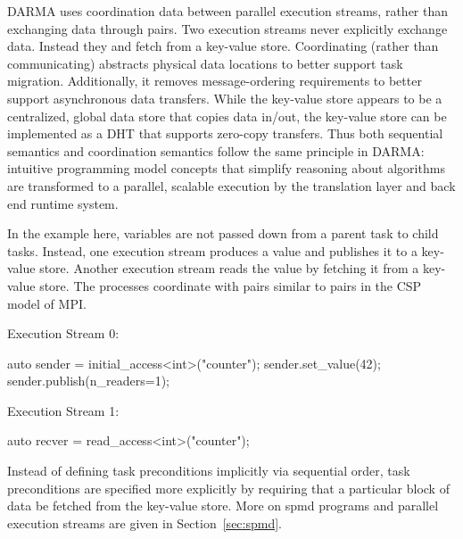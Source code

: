 \gls{DARMA} uses coordination data between parallel \glspl{execution stream},
rather than exchanging data through  pairs. 
Two \glspl{execution stream} never explicitly exchange data. Instead they
 and \gls{fetch} from a \gls{key-value store}.
Coordinating (rather than communicating) abstracts physical data locations to
better support \gls{task} migration.
Additionally, it removes message-ordering requirements to better support
\gls{asynchronous} data transfers.
While the \gls{key-value store} appears to be a centralized, global data store that copies data in/out,
the \gls{key-value store} can be implemented as a \gls{DHT} that supports
\gls{zero-copy} transfers.
Thus both \gls{sequential semantics} and \gls{coordination semantics} follow
the same principle in \gls{DARMA}: intuitive \gls{programming model}
concepts that simplify reasoning about algorithms are 
transformed to a parallel, scalable execution by the \gls{translation layer}
and \gls{back end} \gls{runtime system}.

In the example here, variables are not passed down from a \gls{parent task} to
\glspl{child task}.
Instead, one \gls{execution stream} produces a value and publishes it to a
\gls{key-value store}.
Another \gls{execution stream} reads the value by \gls{fetch}ing it from a
\gls{key-value store}.
The processes coordinate with  pairs similar to
 pairs in
the \gls{CSP} model of MPI.

\begin{minipage}{0.45\textwidth}
Execution Stream 0:
\begin{CppCode}
auto sender = 
   initial_access<int>("counter");
sender.set_value(42);
sender.publish(n_readers=1);
\end{CppCode}
\end{minipage}
\begin{minipage}{0.45\textwidth}
Execution Stream 1:
\begin{CppCode}
auto recver = 
   read_access<int>("counter");
\end{CppCode}
\end{minipage}

Instead of defining \gls{task} \glspl{precondition} implicitly via sequential order,
\gls{task} \glspl{precondition} are specified more explicitly by requiring that
a particular block of data be \gls{fetch}ed from the \gls{key-value store}.
More on \gls{spmd} programs and parallel \glspl{execution stream} are given in
Section~\ref{sec:spmd}.
